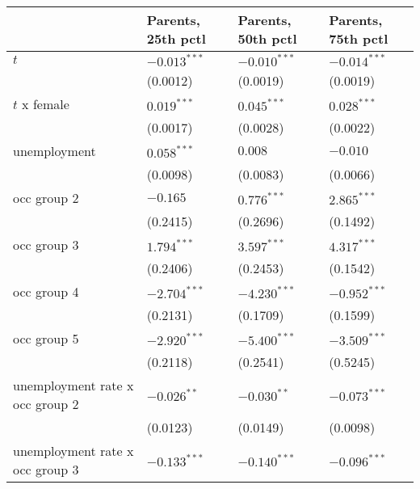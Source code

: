\begin{tabular}{llll}
\toprule
{} & Parents, 25th pctl & Parents, 50th pctl & Parents, 75th pctl \\
\midrule
$t$                                      &     $-0.013^{***}$ &     $-0.010^{***}$ &     $-0.014^{***}$ \\
                                         &           (0.0012) &           (0.0019) &           (0.0019) \\
$t$ x female                             &      $0.019^{***}$ &      $0.045^{***}$ &      $0.028^{***}$ \\
                                         &           (0.0017) &           (0.0028) &           (0.0022) \\
unemployment                             &      $0.058^{***}$ &            $0.008$ &           $-0.010$ \\
                                         &           (0.0098) &           (0.0083) &           (0.0066) \\
occ group 2                              &           $-0.165$ &      $0.776^{***}$ &      $2.865^{***}$ \\
                                         &           (0.2415) &           (0.2696) &           (0.1492) \\
occ group 3                              &      $1.794^{***}$ &      $3.597^{***}$ &      $4.317^{***}$ \\
                                         &           (0.2406) &           (0.2453) &           (0.1542) \\
occ group 4                              &     $-2.704^{***}$ &     $-4.230^{***}$ &     $-0.952^{***}$ \\
                                         &           (0.2131) &           (0.1709) &           (0.1599) \\
occ group 5                              &     $-2.920^{***}$ &     $-5.400^{***}$ &     $-3.509^{***}$ \\
                                         &           (0.2118) &           (0.2541) &           (0.5245) \\
unemployment rate x occ group 2          &      $-0.026^{**}$ &      $-0.030^{**}$ &     $-0.073^{***}$ \\
                                         &           (0.0123) &           (0.0149) &           (0.0098) \\
unemployment rate x occ group 3          &     $-0.133^{***}$ &     $-0.140^{***}$ &     $-0.096^{***}$ \\

\end{tabular}
